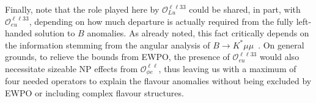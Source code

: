 %
Finally, note that the role played here by $\mathcal{O}_{Lu}^{\ell \ell 3 3}$ could be shared, in part, with $\mathcal{O}_{eu}^{\ell \ell 3 3}$, depending on how much departure is actually required from the fully left-handed solution to $B$ anomalies. As already noted, this fact critically depends on the information stemming from the angular analysis of $B \to K^{*} \mu \mu$~\cite{Ciuchini:2019usw}. On general grounds, to relieve the bounds from EWPO, the presence of $\mathcal{O}_{eu}^{\ell \ell 3 3}$ would also necessitate sizeable NP effects from $\mathcal{O}_{\phi e}^{\ell \ell}$, thus leaving us with a maximum of four needed operators to explain the flavour anomalies without being excluded by EWPO or including complex flavour structures.



